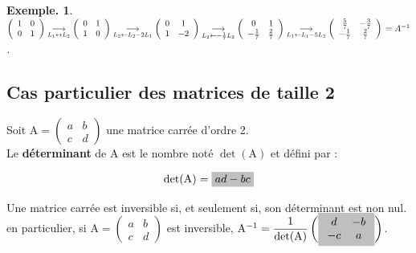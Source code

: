 \documentclass[12pt]{article}
\newcommand{\hideM}[1]{\mbox{\vphantom{$#1$}\smash{\colorbox{gray!50}{$\displaystyle #1$}}} }
\theoremstyle{break}
\newtheorem*{example}{Exemple.}
\begin{document}
\begin{example}
$\left(\begin{array}{ll}1 & 0 \\ 0 & 1\end{array}\right) \underset{L_{1} \leftrightarrow L_{2}}{\longrightarrow}\left(\begin{array}{ll}0 & 1 \\ 1 & 0\end{array}\right) \underset{L_{2} \leftarrow L_{2}-2 L_{1}}{\longrightarrow}\left(\begin{array}{cc}0 & 1 \\ 1 & -2\end{array}\right) \underset{L_{2} \leftarrow-\frac{1}{7} L_{2}}{\longrightarrow}\left(\begin{array}{cc}0 & 1 \\ -\frac{1}{7} & \frac{2}{7}\end{array}\right) \underset{L_{1} \leftarrow L_{1}-5 L_{2}}{\longrightarrow}\left(\begin{array}{cc}\frac{5}{7} & -\frac{3}{7} \\ -\frac{1}{7} & \frac{2}{7}\end{array}\right)
\\=A^{-1}$.
\end{example}

\subsection{Cas particulier des matrices de taille 2}
\begin{definition}{}{}
Soit $\mathrm{A}=\left(\begin{array}{ll}a & b \\ c & d\end{array}\right)$ une matrice carrée d'ordre 2.\\
Le \textbf{déterminant} de A est le nombre noté $\operatorname{det}(\mathrm{A})$ et défini par :

$$
\operatorname{det}(\mathrm{A})=\hideM{a d-b c}
$$
\end{definition}

\begin{proposition}{}{}
Une matrice carrée est inversible si, et seulement si, son déterminant est non nul. en particulier, si $\mathrm{A}=\left(\begin{array}{ll}a & b \\ c & d\end{array}\right)$ est inversible, $\mathrm{A}^{-1}=\dfrac{1}{\operatorname{det}(\mathrm{A})}\left(\hideM{\begin{array}{cc}d & -b \\ -c & a\end{array}}\right)$.
\end{proposition}
\end{document}
